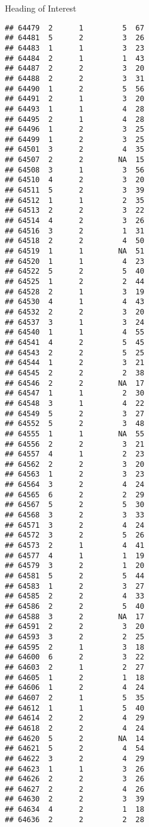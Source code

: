 \documentclass[
  ignorenonframetext,
]{beamer}
\begin{document}
\begin{frame}[fragile]{Heading of Interest}
\begin{verbatim}
## 64479  2      1         5  67
## 64481  5      2         3  26
## 64483  1      1         3  23
## 64484  2      1         1  43
## 64487  2      2         3  20
## 64488  2      2         3  31
## 64490  1      2         5  56
## 64491  2      1         3  20
## 64493  1      1         4  28
## 64495  2      1         4  28
## 64496  1      2         3  25
## 64499  1      2         3  25
## 64501  3      2         4  35
## 64507  2      2        NA  15
## 64508  3      1         3  56
## 64510  4      2         3  20
## 64511  5      2         3  39
## 64512  1      1         2  35
## 64513  2      2         3  22
## 64514  4      2         3  26
## 64516  3      2         1  31
## 64518  2      2         4  50
## 64519  1      1        NA  51
## 64520  1      1         4  23
## 64522  5      2         5  40
## 64525  1      2         2  44
## 64528  2      1         3  19
## 64530  4      1         4  43
## 64532  2      2         3  20
## 64537  3      1         3  24
## 64540  1      1         4  55
## 64541  4      2         5  45
## 64543  2      2         5  25
## 64544  1      2         3  21
## 64545  2      2         2  38
## 64546  2      2        NA  17
## 64547  1      1         2  30
## 64548  3      1         4  22
## 64549  5      2         3  27
## 64552  5      2         3  48
## 64555  1      1        NA  55
## 64556  2      2         3  21
## 64557  4      1         2  23
## 64562  2      2         3  20
## 64563  1      2         3  23
## 64564  3      2         4  24
## 64565  6      2         2  29
## 64567  5      2         5  30
## 64568  3      2         3  33
## 64571  3      2         4  24
## 64572  3      2         5  26
## 64573  2      1         4  41
## 64577  4      1         1  19
## 64579  3      2         1  20
## 64581  5      2         5  44
## 64583  1      2         3  27
## 64585  2      2         4  33
## 64586  2      2         5  40
## 64588  3      2        NA  17
## 64591  2      2         3  20
## 64593  3      2         2  25
## 64595  2      1         3  18
## 64600  6      2         3  22
## 64603  2      1         2  27
## 64605  1      2         1  18
## 64606  1      2         4  24
## 64607  2      1         5  35
## 64612  1      1         5  40
## 64614  2      2         4  29
## 64618  2      2         4  24
## 64620  5      2        NA  14
## 64621  5      2         4  54
## 64622  3      2         4  29
## 64623  1      1         3  26
## 64626  2      2         3  26
## 64627  2      2         4  26
## 64630  2      2         3  39
## 64634  4      2         1  18
## 64636  2      2         2  28

\end{verbatim}
\end{frame}
\end{document}
